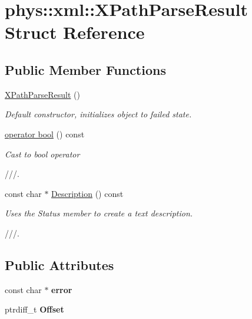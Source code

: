 \hypertarget{structphys_1_1xml_1_1XPathParseResult}{
\section{phys::xml::XPathParseResult Struct Reference}
\label{d8/d54/structphys_1_1xml_1_1XPathParseResult}
}
\subsection*{Public Member Functions}
\begin{DoxyCompactItemize}
\item 
\hypertarget{structphys_1_1xml_1_1XPathParseResult_ac41f4db5604d32679933be58bc74aa23}{
\hyperlink{structphys_1_1xml_1_1XPathParseResult_ac41f4db5604d32679933be58bc74aa23}{XPathParseResult} ()}
\label{d8/d54/structphys_1_1xml_1_1XPathParseResult_ac41f4db5604d32679933be58bc74aa23}

\begin{DoxyCompactList}\small\item\em Default constructor, initializes object to failed state. \item\end{DoxyCompactList}\item 
\hyperlink{structphys_1_1xml_1_1XPathParseResult_a8dddf12100a6c40f9abcd8c0b7b37816}{operator bool} () const 
\begin{DoxyCompactList}\small\item\em Cast to bool operator \par
 ///. \item\end{DoxyCompactList}\item 
const char $\ast$ \hyperlink{structphys_1_1xml_1_1XPathParseResult_a722e220fa91f9bc48357ade351b8b038}{Description} () const 
\begin{DoxyCompactList}\small\item\em Uses the Status member to create a text description. \par
 ///. \item\end{DoxyCompactList}\end{DoxyCompactItemize}
\subsection*{Public Attributes}
\begin{DoxyCompactItemize}
\item 
\hypertarget{structphys_1_1xml_1_1XPathParseResult_ad496c6f03c4664aacd024ac20afc76b7}{
const char $\ast$ {\bfseries error}}
\label{d8/d54/structphys_1_1xml_1_1XPathParseResult_ad496c6f03c4664aacd024ac20afc76b7}

\item 
\hypertarget{structphys_1_1xml_1_1XPathParseResult_acd023d00ea85eb8adbc0a8f4e9d5c7e9}{
ptrdiff\_\-t {\bfseries Offset}}
\label{d8/d54/structphys_1_1xml_1_1XPathParseResult_acd023d00ea85eb8adbc0a8f4e9d5c7e9}

\end{DoxyCompactItemize}


